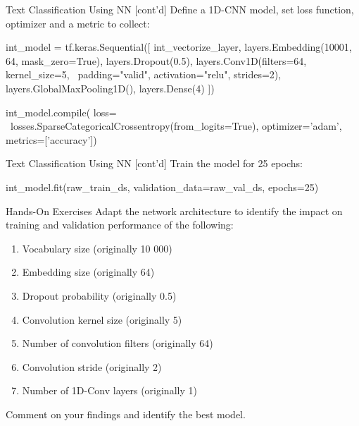 \documentclass[ignorenonframetext,xcolor=x11names]{beamer}
\begin{document}
\begin{frame}[fragile]{Text Classification Using NN \small [cont'd]}
Define a 1D-CNN model, set loss function, optimizer and a metric to collect:
\begin{pythoncode}
int_model = tf.keras.Sequential([
  int_vectorize_layer, 
  layers.Embedding(10001, 64, mask_zero=True),
  layers.Dropout(0.5),
  layers.Conv1D(filters=64, kernel_size=5, \
      padding="valid", activation="relu", strides=2),
  layers.GlobalMaxPooling1D(),
  layers.Dense(4)
  ])

int_model.compile(
    loss= \
losses.SparseCategoricalCrossentropy(from_logits=True),
    optimizer='adam',
    metrics=['accuracy'])
\end{pythoncode}
\end{frame}

\begin{frame}[fragile]{Text Classification Using NN \small [cont'd]}
Train the model for 25 epochs:

\begin{pythoncode}
int_model.fit(raw_train_ds, 
              validation_data=raw_val_ds, 
              epochs=25)
\end{pythoncode}
\end{frame}

\begin{frame}{Hands-On Exercises}
Adapt the network architecture to identify the impact on training and validation performance of the following:
   \begin{enumerate}
      \item Vocabulary size (originally 10 000)
      \item Embedding size (originally 64)
      \item Dropout probability (originally 0.5)
      \item Convolution kernel size (originally 5)
      \item Number of convolution filters (originally 64)
      \item Convolution stride (originally 2)
      \item Number of 1D-Conv layers (originally 1)
   \end{enumerate}
Comment on your findings and identify the best model.
\end{frame}
\end{document}
